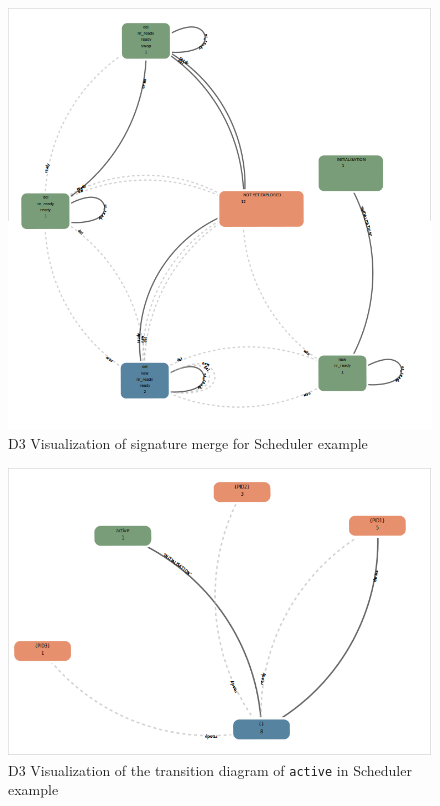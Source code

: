 \begin{center}
\begin{figure}[h!]
\includegraphics[width=14cm]{bilder/sigmerge.png}
\caption{D3 Visualization of signature merge for Scheduler example}
\label{sigmerge}
\end{figure}
\end{center}

\begin{center}
\begin{figure}[h!]
\includegraphics[width=14cm]{bilder/transdiag-wo.png}
\caption{D3 Visualization of the transition diagram of \texttt{active} in Scheduler example}
\label{transdiag}
\end{figure}
\end{center}

